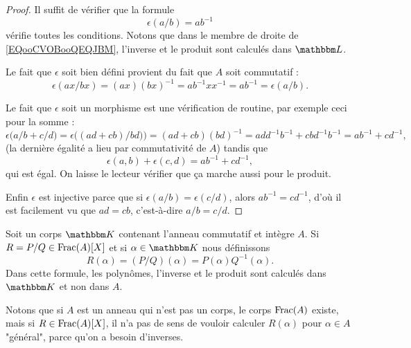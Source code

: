 \begin{proof}
    Il suffit de vérifier que la formule
    \begin{equation}        \label{EQooCVOBooQEQJBM}
        \epsilon(a/b)=ab^{-1}
    \end{equation}
    vérifie toutes les conditions. Notons que dans le membre de droite de \eqref{EQooCVOBooQEQJBM}, l'inverse et le produit sont calculés dans \( \eL\).

    Le fait que \( \epsilon\) soit bien défini provient du fait que \( A\) soit commutatif :
    \begin{equation}
        \epsilon(ax/bx)=(ax)(bx)^{-1}=ab^{-1}xx^{-1}=ab^{-1}=\epsilon(a/b).
    \end{equation}

    Le fait que \( \epsilon\) soit un morphisme est une vérification de routine, par exemple ceci pour la somme :
    \begin{equation}
        \epsilon\big( a/b+c/d \big)=\epsilon\big( (ad+cb)/bd)\big)=(ad+cb)(bd)^{-1}=add^{-1}b^{-1}+cbd^{-1}b^{-1} = ab^{-1}+cd^{-1},
    \end{equation}
    (la dernière égalité a lieu par commutativité de \(A \)) tandis que
    \begin{equation}
        \epsilon(a,b)+\epsilon(c,d)=ab^{-1}+cd^{-1},
    \end{equation}
    qui est égal. On laisse le lecteur vérifier que ça marche aussi pour le produit.

    Enfin \( \epsilon\) est injective parce que si \( \epsilon(a/b)=\epsilon(c/d)\), alors \( ab^{-1}=cd^{-1}\), d'où il est facilement vu que \( ad=cb\), c'est-à-dire \( a/b=c/d\).
\end{proof}

\begin{definition}       \label{DEFooLBIWooCPCaSY}
    Soit un corps \( \eK\) contenant l'anneau commutatif et intègre \( A\). Si \( R=P/Q\in \operatorname{Frac}(A)[X] \) et si \( \alpha\in \eK\) nous définissons
    \begin{equation}
        R(\alpha)=(P/Q)(\alpha)=P(\alpha)Q^{-1}(\alpha).
    \end{equation}
    Dans cette formule, les polynômes, l'inverse et le produit sont calculés dans \( \eK\) et non dans \( A\).
\end{definition}

Notons que si \( A\) est un anneau qui n'est pas un corps, le corps \( \operatorname{Frac}(A)\) existe, mais si \( R\in\operatorname{Frac}(A)[X]\), il n'a pas de sens de vouloir calculer \( R(\alpha)\) pour \( \alpha\in A\) "général", parce qu'on a besoin d'inverses.

